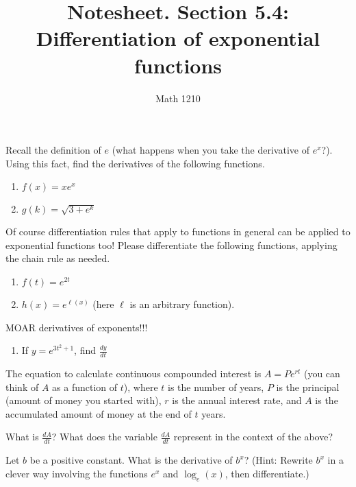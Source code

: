 \documentclass[12pt, a4paper]{article}
\author{Math 1210}
\title{Notesheet. Section 5.4: Differentiation of exponential functions}
\date{}
\begin{document}
\maketitle
\nameline
\begin{ex}
  Recall the definition of $e$ (what happens when you take the derivative of $e^x$?).  Using this fact, find the derivatives of the following functions.
  \begin{enumerate}
    \item $f(x) = xe^x$
    \item $g(k) = \sqrt{3 + e^k}$
  \end{enumerate}
\end{ex}
\begin{ex}
  Of course differentiation rules that apply to functions in general can be applied to exponential functions too!  Please differentiate the following functions, applying the chain rule as needed.
  \begin{enumerate}
    \item $f(t) = e^{2t}$
    \item $h(x) = e^{\ell(x)}$ (here $\ell$ is an arbitrary function).
  \end{enumerate}
\end{ex}
\pagebreak
\begin{ex}
  MOAR derivatives of exponents!!!
  \begin{enumerate}
    \item If $y = e^{3t^2 + 1}$, find $\frac{dy}{dt}$
  \end{enumerate}
\end{ex}
\vspace{-1.1in}
\begin{ex}
  The equation to calculate continuous compounded interest is $A = Pe^{rt}$ (you can think of $A$ as a function of $t$), where $t$ is the number of years, $P$ is the principal (amount of money you started with), $r$ is the annual interest rate, and $A$ is the accumulated amount of money at the end of $t$ years.

  What is $\frac{dA}{dt}$?  What does the variable $\frac{dA}{dt}$ represent in the context of the above?
\end{ex}
\begin{ex}
  Let $b$ be a positive constant.  What is the derivative of $b^x$?  (Hint: Rewrite $b^x$ in a clever way involving the functions $e^x$ and $\log_e(x)$, then differentiate.)
\end{ex}
\end{document}
